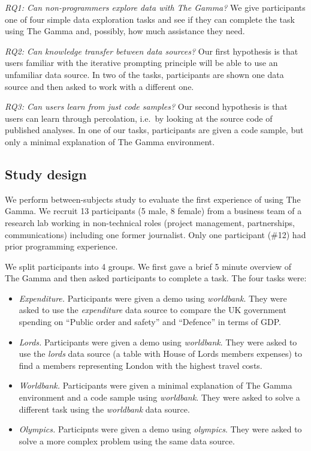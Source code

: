 \documentclass[manuscript,review,anonymous]{acmart}
\begin{document}
\vspace{0.5em}\noindent\emph{RQ1: Can non-programmers explore data with The Gamma?}
We give participants one of four simple data exploration tasks and see if they can complete the
task using The Gamma and, possibly, how much assistance they need.

\vspace{0.5em}\noindent\emph{RQ2: Can knowledge transfer between data sources?}
Our first hypothesis is that users familiar with the iterative prompting principle will be able to
use an unfamiliar data source. In two of the tasks, participants are shown one data source and
then asked to work with a different one.

\vspace{0.5em}\noindent\emph{RQ3: Can users learn from just code samples?}
Our second hypothesis is that users can learn through percolation, i.e.~by looking at the source
code of published analyses. In one of our tasks, participants are given a code sample, but only a
minimal explanation of The Gamma environment.

\subsection{Study design}
We perform between-subjects study to evaluate the first experience of using The Gamma.
We recruit 13 participants (5 male, 8 female) from a business team
of a research lab working in non-technical roles (project management,
partnerships, communications) including one former journalist. Only one participant (\#12)
had prior programming experience.

We split participants into 4 groups. We first gave a brief 5 minute overview of The
Gamma and then asked participants to complete a task.
 The four tasks were:

\begin{itemize}
\item \emph{Expenditure.} Participants were given a demo using \emph{worldbank}.
  They were asked to use the \emph{expenditure} data source to compare the UK government spending
  on ``Public order and safety'' and ``Defence'' in terms of GDP.
\item \emph{Lords.} Participants were given a demo using \emph{worldbank}.
  They were asked to use the \emph{lords} data source (a table with House of Lords
  members expenses) to find a members representing London with the highest travel costs.
\item \emph{Worldbank.} Participants were given a minimal explanation of The Gamma environment and
  a code sample using \emph{worldbank}. They were asked to solve a different task using
  the \emph{worldbank} data source.
\item \emph{Olympics.} Participnts were given a demo using \emph{olympics}.
  They were asked to solve a more complex problem using the same data source.
\end{itemize}
\end{document}

